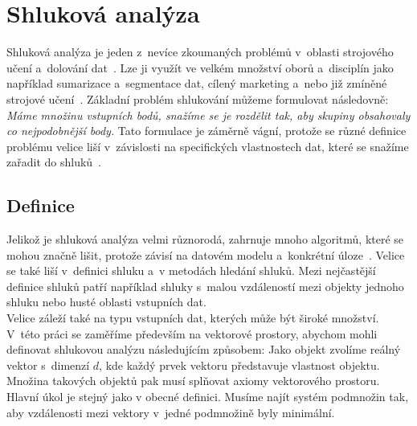 \chapter{Shluková analýza} \label{sec:clusteranalysis}
Shluková analýza je jeden z~nevíce zkoumaných problémů v~oblasti strojového učení a~dolování dat~\cite{Aggarwal13}. Lze ji využít ve velkém množství oborů a~disciplín jako například sumarizace a~segmentace dat, cílený marketing a~nebo již zmíněné strojové učení~\cite{Jain10, Kaufman90}. Základní problém shlukování můžeme formulovat následovně: \textit{Máme množinu vstupních bodů, snažíme se je rozdělit tak, aby skupiny obsahovaly co nejpodobnější body.} Tato formulace je záměrně vágní, protože se různé definice problému velice liší v~závislosti na specifických vlastnostech dat, které se snažíme zařadit do shluků~\cite{Aggarwal13}. 

\section{Definice}
Jelikož je shluková analýza velmi různorodá, zahrnuje mnoho algoritmů, které se mohou značně lišit, protože závisí na datovém modelu a~konkrétní úloze~\cite{Aggarwal13}. Velice se také liší v~definici shluku a~v metodách hledání shluků. Mezi nejčastější definice shluků patří například shluky s~malou vzdá\-le\-nos\-tí mezi objekty jednoho shluku nebo husté oblasti vstupních dat.\\

Velice záleží také na typu vstupních dat, kterých může být široké množství. V~této práci se zaměříme především na vektorové prostory, abychom mohli definovat shlukovou analýzu následujícím způsobem: Jako objekt zvolíme reálný vektor s~dimenzí $d$, kde každý prvek vektoru představuje vlastnost objektu. Množina takových objektů pak musí splňovat axiomy vektorového prostoru. Hlavní úkol je stejný jako v obecné definici. Musíme najít systém podmnožin tak, aby vzdálenosti mezi vektory v~jedné podmnožině byly minimální.


